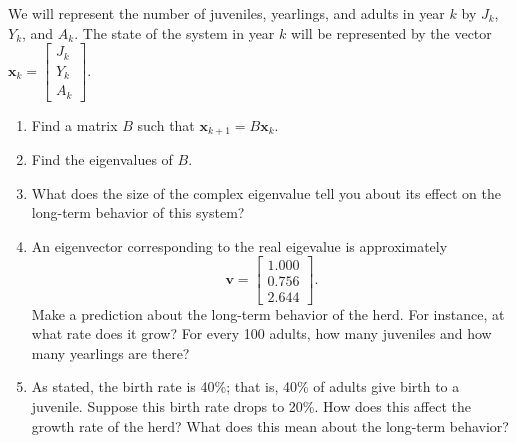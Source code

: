 \documentclass[12pt]{article}
\newcommand{\vs}[1]{\vspace{#1in}}
\newcommand{\vvec}{{\mathbf v}}
\newcommand{\xvec}{{\mathbf x}}
\newcommand{\threevec}[3]{\left[\begin{array}{r}#1 \\ #2 \\ #3
  \end{array}\right]}
\begin{document}
\begin{enumerate}
  We will represent the number of juveniles, yearlings, and adults in
  year $k$ by $J_k$, $Y_k$, and $A_k$.  The state of the system in
  year $k$ will be represented by the vector
  $\xvec_k=\threevec{J_k}{Y_k}{A_k}$.

  \begin{enumerate}[label=(\alph*)]
  \item Find a matrix $B$ such that
    $
    \xvec_{k+1}=B\xvec_k
    $.

    \vs{1.5}
  \item Find the eigenvalues of $B$.  

    \vs{1.25}
    \newpage
  \item What does the size of the complex eigenvalue tell you about
    its effect on the long-term behavior of this system?

    \vs{1}
  \item An eigenvector corresponding to the real eigevalue is approximately
    $$
    \vvec = \threevec{1.000}{0.756}{2.644}.
    $$
    Make a prediction about the long-term behavior of the herd.  For
    instance, at what rate does it grow?  For every 100 adults, how
    many juveniles and how many yearlings are there?

    \vs{2}
  \item As stated, the birth rate is 40\%;  that is, 40\% of adults
    give birth to a juvenile.  Suppose this birth rate drops to 20\%.
    How does this affect the growth rate of the herd?  What does this
    mean about the long-term behavior?

    \vs{2}
  \end{enumerate}
  
  

\end{enumerate}
\end{document}
